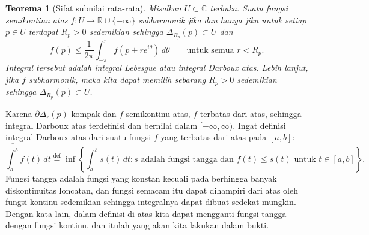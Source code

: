 \documentclass[12pt,openany]{book}
\newcommand{\C}{{\mathbb{C}}}
\newcommand{\R}{{\mathbb{R}}}
\theoremstyle{plain}
\newtheorem{thm}{Teorema}[section]
\theoremstyle{remark}
\theoremstyle{definition}
\theoremstyle{exercise}
\theoremstyle{example}
\begin{document}
\begin{thm}[Sifat subnilai rata-rata]
\label{thm:submeanprop}
Misalkan $U \subset \C$ terbuka.
Suatu fungsi semikontinu atas $f \colon U \to \R \cup \{ -\infty \}$
subharmonik jika dan hanya jika
untuk setiap $p \in U$ terdapat $R_p > 0$ sedemikian sehingga
$\Delta_{R_p}(p) \subset U$ dan
\begin{equation*}
f(p) \leq \frac{1}{2\pi} \int_{-\pi}^{\pi} f(p+re^{i\theta})\, d\theta
\qquad \text{untuk semua } r < R_p .
\end{equation*}
Integral tersebut adalah integral Lebesgue atau integral Darboux atas.
Lebih lanjut, jika $f$ subharmonik, maka kita dapat memilih sebarang
$R_p > 0$ sedemikian sehingga $\Delta_{R_p}(p) \subset U$.
\end{thm}

Karena $\partial \Delta_r(p)$ kompak dan $f$ semikontinu atas,
$f$ terbatas dari atas, sehingga integral Darboux atas terdefinisi
dan bernilai dalam $[-\infty,\infty)$.
Ingat definisi integral Darboux atas dari suatu fungsi $f$ yang terbatas dari atas
pada $[a,b]$:
\begin{equation*}
\overline{\int_a^b} f(t) \,dt
\overset{\text{def}}{=}
\inf \left\{ \int_a^b s(t) \, dt : s
\text{ adalah fungsi tangga dan } f(t) \leq s(t) \text{ untuk } t \in
[a,b] \right\} .
\end{equation*}
Fungsi tangga adalah fungsi yang konstan kecuali pada berhingga banyak
diskontinuitas loncatan, dan fungsi semacam itu
dapat dihampiri dari atas oleh fungsi kontinu
sedemikian sehingga integralnya dapat dibuat sedekat mungkin.
Dengan kata lain, dalam definisi di atas kita dapat mengganti
fungsi tangga dengan fungsi kontinu, dan itulah yang akan kita lakukan dalam
bukti.
\end{document}
